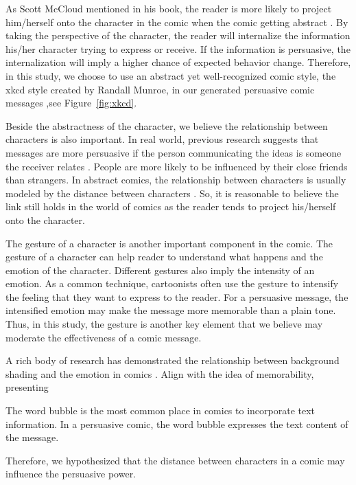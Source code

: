 As Scott McCloud mentioned in his book, the reader is more likely to project him/herself onto the character in the comic when the comic getting abstract \cite{scott1993understanding}. By taking the perspective of the character, the reader will internalize the information his/her character trying to express or receive. If the information is persuasive, the internalization will imply a higher chance of expected behavior change. Therefore, in this study, we choose to use an abstract yet well-recognized comic style, the xkcd style created by Randall Munroe, in our generated persuasive comic messages \cite{munroe2009xkcd},see Figure~\ref{fig:xkcd}.

Beside the abstractness of the character, we believe the relationship between characters is also important. In real world, previous research suggests that messages are more persuasive if the person communicating the ideas is someone the receiver relates \cite{daddis2008influence,merga2014peer,shin2013user}. People are more likely to be influenced by their close friends than strangers. In abstract comics, the relationship between characters is usually modeled by the distance between characters \cite{scott1993understanding}. So, it is reasonable to believe the link still holds in the world of comics as the reader tends to project his/herself onto the character.

The gesture of a character is another important component in the comic. The gesture of a character can help reader to understand what happens and the emotion of the character. Different gestures also imply the intensity of an emotion. As a common technique, cartoonists often use the gesture to intensify the feeling that they want to express to the reader. For a persuasive message, the intensified emotion may make the message more memorable than a plain tone. Thus, in this study, the gesture is another key element that we believe may moderate the effectiveness of a comic message.

A rich body of research has demonstrated the relationship between background shading and the emotion in comics \cite{scott1993understanding}. Align with the idea of memorability, presenting

The word bubble is the most common place in comics to incorporate text information. In a persuasive comic, the word bubble expresses the text content of the message.  \par


Therefore, we hypothesized that the distance between characters in a comic may influence the persuasive power.

